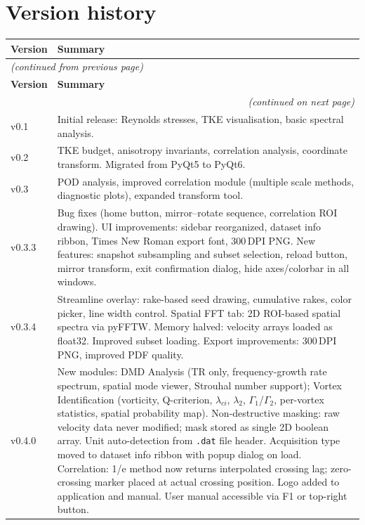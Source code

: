 \section{Version history}

\begin{longtable}{lp{12cm}}
\toprule
\textbf{Version} & \textbf{Summary} \\
\midrule
\endfirsthead

\multicolumn{2}{l}{\small\textit{(continued from previous page)}} \\
\toprule
\textbf{Version} & \textbf{Summary} \\
\midrule
\endhead

\midrule
\multicolumn{2}{r}{\small\textit{(continued on next page)}} \\
\endfoot

\bottomrule
\endlastfoot
v0.1   & Initial release: Reynolds stresses, TKE visualisation, basic spectral analysis. \\
v0.2   & TKE budget, anisotropy invariants, correlation analysis, coordinate transform. Migrated from PyQt5 to PyQt6. \\
v0.3   & POD analysis, improved correlation module (multiple scale methods, diagnostic plots), expanded transform tool. \\
v0.3.3 & Bug fixes (home button, mirror--rotate sequence, correlation ROI drawing). UI improvements: sidebar reorganized, dataset info ribbon, Times New Roman export font, 300\,DPI PNG. New features: snapshot subsampling and subset selection, reload button, mirror transform, exit confirmation dialog, hide axes/colorbar in all windows. \\
v0.3.4 & Streamline overlay: rake-based seed drawing, cumulative rakes, color picker, line width control. Spatial FFT tab: 2D ROI-based spatial spectra via pyFFTW. Memory halved: velocity arrays loaded as float32. Improved subset loading. Export improvements: 300\,DPI PNG, improved PDF quality. \\
v0.4.0 & New modules: DMD Analysis (TR only, frequency-growth rate spectrum, spatial mode viewer, Strouhal number support); Vortex Identification (vorticity, Q-criterion, $\lambda_{ci}$, $\lambda_2$, $\Gamma_1$/$\Gamma_2$, per-vortex statistics, spatial probability map). Non-destructive masking: raw velocity data never modified; mask stored as single 2D boolean array. Unit auto-detection from \texttt{.dat} file header. Acquisition type moved to dataset info ribbon with popup dialog on load. Correlation: 1/e method now returns interpolated crossing lag; zero-crossing marker placed at actual crossing position. Logo added to application and manual. User manual accessible via F1 or top-right button. \\

\end{longtable}
